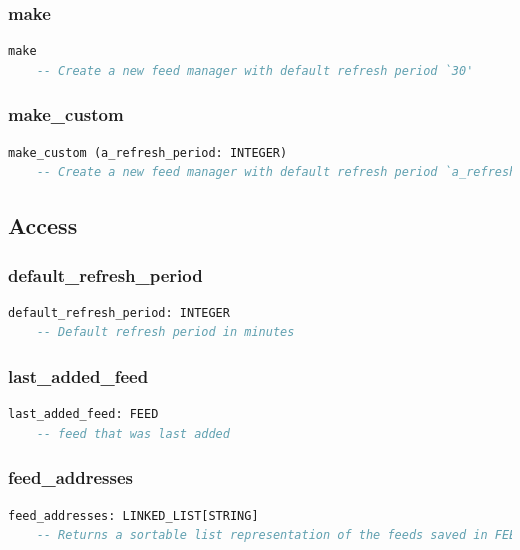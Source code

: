 \subsubsection{make}

\begin{lstlisting}[language=Eiffel]
make
    -- Create a new feed manager with default refresh period `30'

\end{lstlisting}


\subsubsection{make\_custom}

\begin{lstlisting}[language=Eiffel]
make_custom (a_refresh_period: INTEGER)
    -- Create a new feed manager with default refresh period `a_refresh_period'
\end{lstlisting}


\subsection{Access}
\label{sec:feed-manager-access}

\subsubsection{default\_refresh\_period}

\begin{lstlisting}[language=Eiffel]
default_refresh_period: INTEGER
    -- Default refresh period in minutes
\end{lstlisting}

\subsubsection{last\_added\_feed}

\begin{lstlisting}[language=Eiffel]
last_added_feed: FEED
    -- feed that was last added
\end{lstlisting}

\subsubsection{feed\_addresses}

\begin{lstlisting}[language=Eiffel]
feed_addresses: LINKED_LIST[STRING]
    -- Returns a sortable list representation of the feeds saved in FEED_MANAGER
\end{lstlisting}

